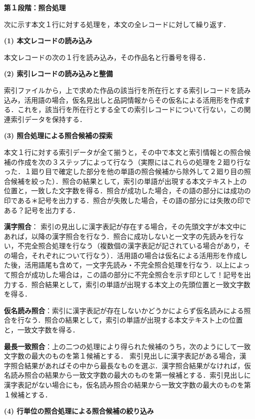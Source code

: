 \noindent
{\bf 第１段階：照合処理}

次に示す本文１行に対する処理を，本文の全レコードに対して繰り返す．

\noindent
{\bf (1) 本文レコードの読み込み}

本文レコードの次の１行を読み込み，その作品名と行番号を得る．

\noindent
{\bf (2) 索引レコードの読み込みと整備}

索引ファイルから，上で求めた作品の該当行を所在行とする索引レコードを読み込み，活用語の場合，仮名見出しと品詞情報からその仮名による活用形を作成する．これを，該当行を所在行とする全ての索引レコードについて行ない，この関連索引データを保持する．

\noindent
{\bf (3) 照合処理による照合候補の探索}

本文１行に対する索引データが全て揃うと，その中で本文と索引情報との照合候補の作成を次の３ステップによって行なう（実際にはこれらの処理を２廻り行なった．１廻り目で確定した部分を他の単語の照合候補から除外して２廻り目の照合候補を絞った）．照合の結果として，索引の単語が出現する本文テキスト上の位置と，一致した文字数を得る．照合が成功した場合，その語の部分には成功の印である＊記号を出力する．照合が失敗した場合，その語の部分には失敗の印である？記号を出力する．

\noindent
{\bf 漢字照合}：
索引の見出しに漢字表記が存在する場合，その先頭文字が本文中にあれば，以降の漢字照合を行なう．照合に成功しないと一文字の先読みを行ない，不完全照合処理を行なう（複数個の漢字表記が記されている場合があり，その場合，それぞれについて行なう）．活用語の場合は仮名による活用形を作成した後，活用語尾も含めて，一文字先読み・不完全照合処理を行なう．以上によって照合が成功した場合は，この語の部分に不完全照合を示す印として！記号を出力する．照合結果として，索引の単語が出現する本文上の先頭位置と一致文字数を得る．

\noindent
{\bf 仮名読み照合}：索引に漢字表記が存在しないかどうかによらず仮名読みによる照合を行なう．照合の結果として，索引の単語が出現する本文テキスト上の位置と，一致文字数を得る．

\noindent
{\bf 最長一致照合}：上の二つの処理により得られた候補のうち，次のようにして一致文字数の最大のものを第１候補とする．
索引見出しに漢字表記がある場合，漢字照合結果があればその中から最長なものを選ぶ．漢字照合結果がなければ，仮名読み照合の結果から一致文字数の最大のものを第一候補とする．索引見出しに漢字表記がない場合にも，仮名読み照合の結果から一致文字数の最大のものを第１候補とする．

\noindent
{\bf (4) 行単位の照合処理による照合候補の絞り込み}

